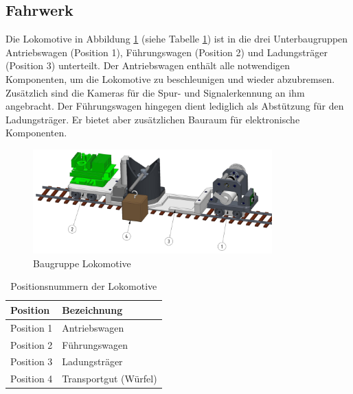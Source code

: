 \documentclass[../../main.tex]{subfiles}
\begin{document}
    \subsection{Fahrwerk}
    Die Lokomotive in Abbildung \ref{fig:bg_lokomotive} (siehe Tabelle \ref{tab:bg_lokomotive}) ist in die drei Unterbaugruppen Antriebswagen (Position 1), Führungswagen (Position 2) und Ladungsträger (Position 3) unterteilt. Der Antriebswagen enthält alle notwendigen Komponenten, um die Lokomotive zu beschleunigen und wieder abzubremsen. Zusätzlich sind die Kameras für die Spur- und Signalerkennung an ihm angebracht. Der Führungswagen hingegen dient lediglich als Abstützung für den Ladungsträger. Er bietet aber zusätzlichen Bauraum für elektronische Komponenten.\\

    \begin{figure}[H] %
        \centering
        \includegraphics[width=0.82\textwidth]{Lokomotive.png}
        \caption{Baugruppe Lokomotive}
        \label{fig:bg_lokomotive}
    \end{figure}

    \begin{table}[H] \centering
        \begin{tabular}{|l|l|}
        \hline
        \textbf{Position} & \textbf{Bezeichnung}\\
        \hline
        Position 1          & Antriebswagen\\
         \hline
        Position 2          & Führungswagen\\
        \hline
        Position 3          & Ladungsträger\\
        \hline
        Position 4          & Transportgut (Würfel)\\
        \hline
        \end{tabular}

        \caption{Positionsnummern der Lokomotive}
        \label{tab:bg_lokomotive}
    \end{table}
\end{document}
